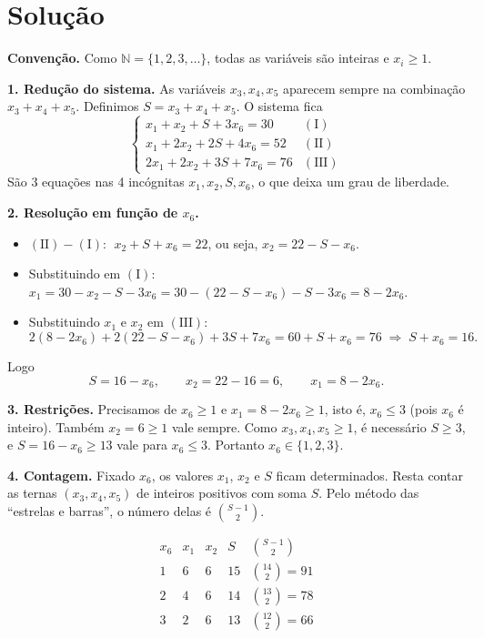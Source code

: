 \documentclass{article}%
\begin{document}
\section*{Solução}

\textbf{Convenção.} Como $\mathbb{N}=\{1,2,3,\dots\}$, todas as variáveis são inteiras e $x_i\ge 1$.

\textbf{1. Redução do sistema.} As variáveis $x_3,x_4,x_5$ aparecem sempre na combinação $x_3+x_4+x_5$. Definimos $S=x_3+x_4+x_5$. O sistema fica
\[
\begin{cases}
x_1+x_2+S+3x_6=30 & (\mathrm{I})\\
x_1+2x_2+2S+4x_6=52 & (\mathrm{II})\\
2x_1+2x_2+3S+7x_6=76 & (\mathrm{III})
\end{cases}
\]
São 3 equações nas 4 incógnitas $x_1,x_2,S,x_6$, o que deixa um grau de liberdade.

\textbf{2. Resolução em função de $x_6$.}
\begin{itemize}
\item $(\mathrm{II})-(\mathrm{I})$: $\;x_2+S+x_6=22$, ou seja, $x_2=22-S-x_6$.
\item Substituindo em $(\mathrm{I})$: $x_1=30-x_2-S-3x_6=30-(22-S-x_6)-S-3x_6=8-2x_6$.
\item Substituindo $x_1$ e $x_2$ em $(\mathrm{III})$:
\[
2(8-2x_6)+2(22-S-x_6)+3S+7x_6=60+S+x_6=76 \;\Rightarrow\; S+x_6=16 .
\]
\end{itemize}
Logo
\[
S=16-x_6,\qquad x_2=22-16=6,\qquad x_1=8-2x_6 .
\]

\textbf{3. Restrições.} Precisamos de $x_6\ge1$ e $x_1=8-2x_6\ge 1$, isto é, $x_6\le 3$ (pois $x_6$ é inteiro). Também $x_2=6\ge 1$ vale sempre. Como $x_3,x_4,x_5\ge1$, é necessário $S\ge 3$, e $S=16-x_6\ge 13$ vale para $x_6\le 3$. Portanto $x_6\in\{1,2,3\}$.

\textbf{4. Contagem.} Fixado $x_6$, os valores $x_1$, $x_2$ e $S$ ficam determinados. Resta contar as ternas $(x_3,x_4,x_5)$ de inteiros positivos com soma $S$. Pelo método das ``estrelas e barras'', o número delas é $\binom{S-1}{2}$.

\[
\begin{array}{c|c|c|c|c}
x_6 & x_1 & x_2 & S & \binom{S-1}{2}\\\hline
1 & 6 & 6 & 15 & \binom{14}{2}=91\\
2 & 4 & 6 & 14 & \binom{13}{2}=78\\
3 & 2 & 6 & 13 & \binom{12}{2}=66
\end{array}
\]
\end{document}
